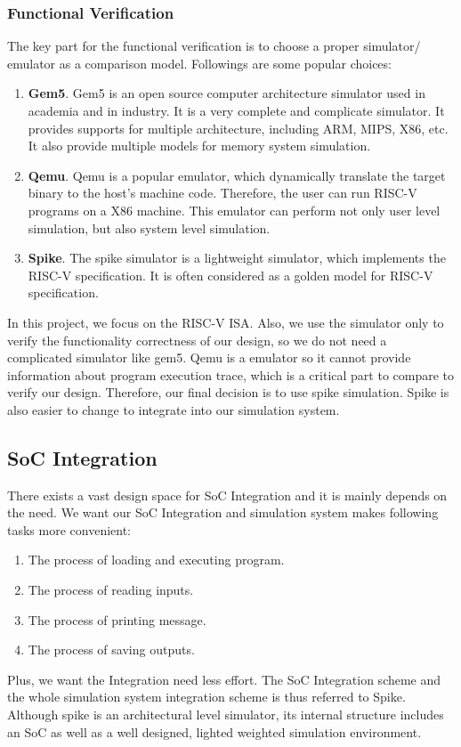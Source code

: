\subsubsection{Functional Verification}
The key part for the functional verification is to choose a proper simulator/ emulator as a comparison model. Followings are some popular choices:
\begin{enumerate}
    \item \textbf{Gem5}. Gem5 is an open source computer architecture simulator used in academia and in industry. It is a very complete and complicate simulator. It provides supports for multiple architecture, including ARM, MIPS, X86, etc. It also provide multiple models for memory system simulation.
    \item \textbf{Qemu}. Qemu is a popular emulator, which dynamically translate the target binary to the host's machine code. Therefore, the user can run RISC-V programs on a X86 machine. This emulator can perform not only user level simulation, but also system level simulation.
    \item \textbf{Spike}. The spike simulator is a lightweight simulator, which implements the RISC-V specification. It is often considered as a golden model for RISC-V specification.
\end{enumerate}

In this project, we focus on the RISC-V ISA. Also, we use the simulator only to verify the functionality correctness of our design, so we do not need a complicated simulator like gem5. Qemu is a emulator so it cannot provide information about program execution trace, which is a critical part to compare to verify our design. Therefore, our final decision is to use spike simulation. Spike is also easier to change to integrate into our simulation system.


\subsection{SoC Integration}
There exists a vast design space for SoC Integration and it is mainly depends on the need. We want our SoC Integration and simulation system makes following tasks more convenient:
\begin{enumerate}
    \item The process of loading and executing program.
    \item The process of reading inputs.
    \item The process of printing message.
    \item The process of saving outputs.
\end{enumerate}
Plus, we want the Integration need less effort. The SoC Integration scheme and the whole simulation system integration scheme is thus referred to Spike. Although spike is an architectural level simulator, its internal structure includes an SoC as well as a well designed, lighted weighted simulation environment.

